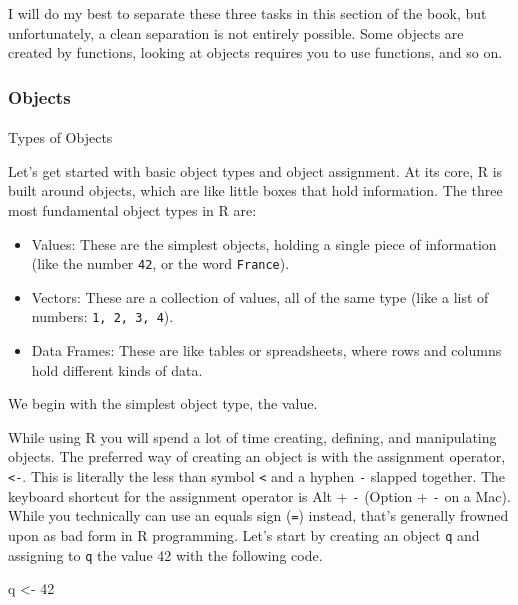 \documentclass[
  letterpaper,
]{book}
\makeatletter
\let\oldparagraph\paragraph
\renewcommand{\paragraph}{
    \@ifstar
      \xxxParagraphStar
      \xxxParagraphNoStar
  }
\newcommand{\xxxParagraphStar}[1]{\oldparagraph*{#1}\mbox{}}
\newcommand{\xxxParagraphNoStar}[1]{\oldparagraph{#1}\mbox{}}
\newenvironment{Shaded}{\begin{snugshade}}{\end{snugshade}}
\newcommand{\DecValTok}[1]{\textcolor[rgb]{0.68,0.00,0.00}{#1}}
\newcommand{\NormalTok}[1]{\textcolor[rgb]{0.00,0.23,0.31}{#1}}
\newcommand{\OtherTok}[1]{\textcolor[rgb]{0.00,0.23,0.31}{#1}}
\providecommand{\tightlist}{%
  \setlength{\itemsep}{0pt}\setlength{\parskip}{0pt}}\usepackage{longtable,booktabs,array}
\makeatother
\begin{document}
I will do my best to separate these three tasks in this section of the
book, but unfortunately, a clean separation is not entirely possible.
Some objects are created by functions, looking at objects requires you
to use functions, and so on.

\subsubsection{Objects}\label{objects}

\paragraph{Types of Objects}\label{types-of-objects}

Let's get started with basic object types and object assignment. At its
core, R is built around objects, which are like little boxes that hold
information. The three most fundamental object types in R are:

\begin{itemize}
\tightlist
\item
  Values: These are the simplest objects, holding a single piece of
  information (like the number \texttt{42}, or the word
  \texttt{France}).
\item
  Vectors: These are a collection of values, all of the same type (like
  a list of numbers: \texttt{1,\ 2,\ 3,\ 4}).
\item
  Data Frames: These are like tables or spreadsheets, where rows and
  columns hold different kinds of data.
\end{itemize}

We begin with the simplest object type, the value.

While using R you will spend a lot of time creating, defining, and
manipulating objects. The preferred way of creating an object is with
the assignment operator, \texttt{\textless{}-}. This is literally the
less than symbol \texttt{\textless{}} and a hyphen \texttt{-} slapped
together. The keyboard shortcut for the assignment operator is Alt +
\texttt{-} (Option + \texttt{-} on a Mac). While you technically can use
an equals sign (\texttt{=}) instead, that's generally frowned upon as
bad form in R programming. Let's start by creating an object \texttt{q}
and assigning to \texttt{q} the value 42 with the following code.

\begin{Shaded}
\begin{Highlighting}[]
\NormalTok{q }\OtherTok{\textless{}{-}} \DecValTok{42}
\end{Highlighting}
\end{Shaded}
\end{document}
